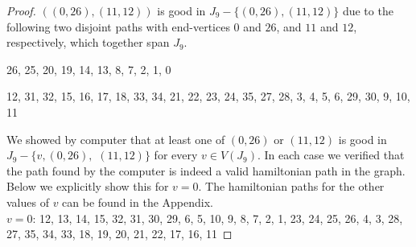 \documentclass{amcjoucc}
\begin{document}
\begin{proof}

$((0,26),(11,12))$ is good in $J_9 - \{(0,26),(11,12)\}$ due to the following two disjoint paths with end-vertices $0$ and $26$, and $11$ and $12$, respectively, which together span $J_9$.


\begin{itemize}
{\small
\item 26, 25, 20, 19, 14, 13, 8, 7, 2, 1, 0
\item 12, 31, 32, 15, 16, 17, 18, 33, 34, 21, 22, 23, 24, 35, 27, 28, 3, 4, 5, 6, 29, 30, 9, 10, 11}
\end{itemize}


We showed by computer that at least one of $(0,26)$ or $(11,12)$ is good in $J_9 - \{v,(0,26),$ $(11,12)\}$ for every $v \in V(J_9)$. In each case we verified that the path found by the computer is indeed a valid hamiltonian path in the graph. Below we explicitly show this for $v = 0$. The hamiltonian paths for the other values of $v$ can be found in the Appendix.\\
{\small
\noindent $v = 0$: 12, 13, 14, 15, 32, 31, 30, 29, 6, 5, 10, 9, 8, 7, 2, 1, 23, 24, 25, 26, 4, 3, 28, 27, 35, 34, 33, 18, 19, 20, 21, 22, 17, 16, 11}
\end{proof}
\end{document}
